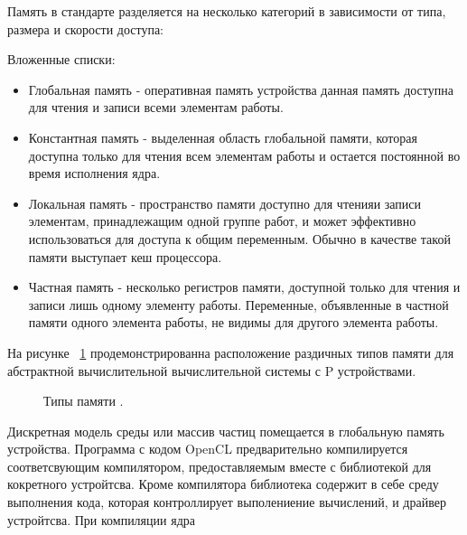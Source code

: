 Память в стандарте разделяется на несколько категорий в зависимости от типа, размера и скорости доступа:

\noindent Вложенные списки:
\begin{itemize}
  \item Глобальная память - оперативная память устройства данная память доступна для чтения и записи всеми элементам работы.
  \item Константная память - выделенная область  глобальной  памяти, которая  доступна только для чтения всем элементам работы и остается постоянной во время исполнения ядра.
  \item Локальная память - пространство памяти доступно для чтенияи записи элементам, принадлежащим одной группе работ, и может эффективно использоваться для доступа к общим переменным. Обычно в качестве такой памяти выступает кеш процессора.
  \item Частная память - несколько регистров памяти, доступной только для чтения и записи лишь одному элементу работы. Переменные, объявленные в частной памяти одного элемента работы, не видимы для другого элемента работы.
\end{itemize}
На рисунке ~\ref{fig:ocl_memory} продемонстрированна расположение раздичных типов памяти для абстрактной вычислительной вычислительной системы с P устройствами.

\begin{figure}[ht]
  \caption{Типы памяти .}\label{fig:ocl_memory}
\end{figure}

Дискретная модель среды или массив частиц помещается в глобальную память устройства. Программа с кодом OpenCL предварительно компилируется соответсвующим компилятором, предоставляемым вместе с библиотекой для кокретного устройтсва. Кроме компилятора библиотека содержит в себе среду выполнения кода, которая контроллирует выполениение вычислений, и драйвер устройтсва. При компиляции ядра